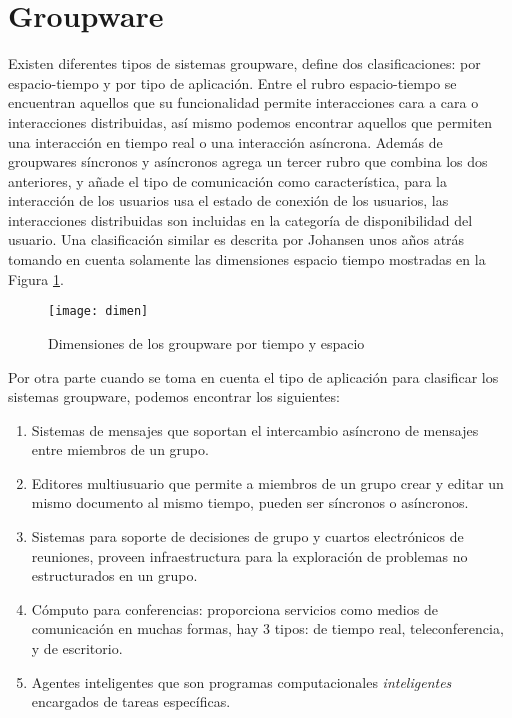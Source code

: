 \section{Groupware}

Existen diferentes tipos de sistemas groupware, \citep{ellis1991groupware} define dos clasificaciones: por espacio-tiempo y por tipo de aplicaci\'on. Entre el rubro espacio-tiempo se encuentran aquellos que su funcionalidad permite interacciones cara a cara o interacciones distribuidas, as\'i mismo podemos encontrar aquellos que permiten una interacci\'on en tiempo real o una interacci\'on as\'incrona. Adem\'as de groupwares s\'incronos y as\'incronos agrega un tercer rubro que combina los dos anteriores, y a\~nade el tipo de comunicaci\'on como caracter\'istica, para la interacci\'on de los usuarios usa el estado de conexi\'on de los usuarios, las interacciones distribuidas son incluidas en la categor\'ia de disponibilidad del usuario\citep{antunes2014reviewing}. Una clasificaci\'on similar es descrita por Johansen unos a\~nos atr\'as tomando en cuenta solamente las dimensiones espacio tiempo mostradas en la Figura \ref{gw:class}.

\begin{figure}[h!]
  \centering
  \texttt{[image: dimen]}
  \caption{Dimensiones de los groupware por tiempo y espacio \citep{johansen1988groupware}}
  \label{gw:class}
\end{figure}

Por otra parte cuando se toma en cuenta el tipo de aplicaci\'on para clasificar los sistemas groupware, podemos encontrar los siguientes: 
\begin{enumerate}
\item Sistemas de mensajes que soportan el intercambio as\'incrono de mensajes entre miembros de un grupo.
\item Editores multiusuario que permite a miembros de un grupo crear y editar un mismo documento al mismo tiempo, pueden ser s\'incronos o as\'incronos.
\item Sistemas para soporte de decisiones de grupo y cuartos electr\'onicos de reuniones, proveen infraestructura para la exploraci\'on de problemas no estructurados en un grupo.
\item C\'omputo para conferencias: proporciona servicios como medios de comunicaci\'on en muchas formas, hay 3 tipos: de tiempo real, teleconferencia, y de escritorio.
\item Agentes inteligentes que son programas computacionales \textit{inteligentes} encargados de tareas espec\'ificas.
\end{enumerate}

